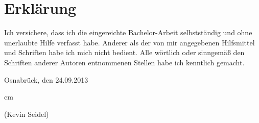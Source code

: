 \documentclass{AGTI}
\begin{document}
\tableofcontents

\cleardoublepage










%
%
%
%

%
%
%
%

%

%


\cleardoublepage

  \vspace*{15cm}

  \chapter*{Erklärung}

  \thispagestyle{empty}

  Ich versichere, dass ich die eingereichte Bachelor-Arbeit selbstständig und ohne
  unerlaubte Hilfe verfasst habe. Anderer als der von mir angegebenen Hilfsmittel und
  Schriften habe ich mich nicht bedient. Alle wörtlich oder sinngemäß den Schriften
  anderer Autoren entnommenen Stellen habe ich kenntlich gemacht.

  \bigskip\bigskip

\begin{flushright}
Osnabrück, den 24.09.2013
\end{flushright}
 cm

 \bigskip
 \bigskip
 \bigskip
 \bigskip
 \bigskip

 (Kevin Seidel)
\end{document}
